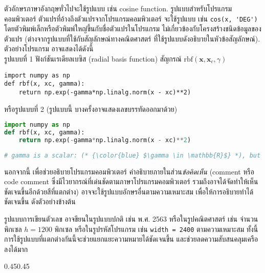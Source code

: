 %
ตัวอักษรภาษาอังกฤษทั่วไปจะใช้รูปแบบ เช่น %
cosine function.
รูปแบบสำหรับโปรแกรมคอมพิวเตอร์ ตัวแปรที่อ้างถึงตัวแปรจากโปรแกรมคอมพิวเตอร์ จะใช้รูปแบบ เช่น \verb|cos(x, 'DEG')| 
โดยตัวพิมพ์เล็กหรือตัวพิมพ์ใหญ่ขึ้นกับชื่อตัวแปรในโปรแกรม ไม่เกี่ยวข้องกับโครงสร้างชนิดข้อมูลของตัวแปร (ต่างจากรูปแบบที่ใช้กับสัญลักษณ์ทางคณิตศาสตร์ ที่ใช้รูปแบบดังอธิบายในหัวข้อสัญลักษณ์). 
ตัวอย่างโปรแกรม อาจแสดงได้ดังนี้
\\
รูปแบบที่ 1 ฟังก์ชันเรเดียลเบซิส (radial basis function) สัญกรณ์ $\mathrm{rbf}(\bm{x}, \bm{x}_c, \gamma)$
\begin{Verbatim}[fontsize=\small]
import numpy as np
def rbf(x, xc, gamma):	
    return np.exp(-gamma*np.linalg.norm(x - xc)**2)
\end{Verbatim}

%
\noindent
หรือรูปแบบที่ 2
(รูปแบบนี้ บางครั้งอาจแสดงเลขบรรทัดออกมาด้วย)
\begin{lstlisting}[language=Python, numbers=none]
import numpy as np
def rbf(x, xc, gamma):	
    return np.exp(-gamma*np.linalg.norm(x - xc)**2)
    
# gamma is a scalar: (* {\color{blue} $\gamma \in \mathbb{R}$} *), but x is a vector: (* {\color{blue} $\bm{x} \in \mathbb{R}^D$} *)
\end{lstlisting}

นอกจากนี้ เพื่อช่วยอธิบายโปรแกรมคอมพิวเตอร์ คำอธิบายภายในส่วน\textit{ข้อคิดเห็น} (comment หรือ code comment ซึ่งมีไวยากรณ์ที่เด่นชัดตามภาษาโปรแกรมคอมพิวเตอร์ รวมถึงอาจได้จัดทำให้เห็นชัดเจนขึ้นอีกด้วยสีที่แตกต่าง) อาจจะใช้รูปแบบอักษรอื่นตามความเหมาะสม เพื่อให้การอธิบายทำได้ชัดเจนขึ้น ดังตัวอย่างข้างต้น

รูปแบบการเขียนตัวเลข อาจขียนในรูปแบบปกติ เช่น พ.ศ. 2563 หรือในรูปคณิตศาสตร์ เช่น จำนวนพิกเซล $h = 1200$ พิกเซล 
หรือในรูปรหัสโปรแกรม เช่น \texttt{width = 2400} ตามความเหมาะสม
ทั้งนี้ การใช้รูปแบบที่แตกต่างกันนี้จะช่วยแยกแยะความหมายได้ชัดเจนขึ้น
และช่วยลดความสับสนคลุมเครือลงได้มาก

\vfill
\begin{Parallel}[c]{0.45\textwidth}{0.45\textwidth}
\end{Parallel}


